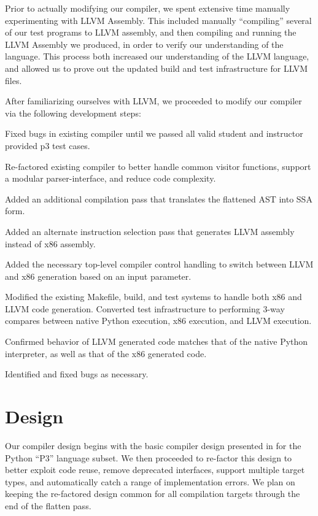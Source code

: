 \documentclass[11pt,twocolumn]{article}
\newenvironment{packed_enum}{
\begin{enumerate}
  \setlength{\itemsep}{1pt}
  \setlength{\parskip}{0pt}
  \setlength{\parsep}{0pt}
}{\end{enumerate}}
\begin{document}
Prior to actually modifying our compiler, we spent extensive time
manually experimenting with LLVM Assembly. This included manually
``compiling'' several of our test programs to LLVM assembly, and then
compiling and running the LLVM Assembly we produced, in order to
verify our understanding of the language. This process both increased
our understanding of the LLVM language, and allowed us to prove out the
updated build and test infrastructure for LLVM files.

After familiarizing ourselves with LLVM, we proceeded to modify our
compiler via the following development steps:

\begin{packed_enum}
\item Fixed bugs in existing compiler until we passed all valid student
  and instructor provided p3 test cases.
\item Re-factored existing compiler to better handle common visitor
  functions, support a modular parser-interface, and reduce code
  complexity.
\item Added an additional compilation pass that translates the flattened
  AST into SSA form.
\item Added an alternate instruction selection pass that generates LLVM
  assembly instead of x86 assembly.
\item Added the necessary top-level compiler control handling to switch
  between LLVM and x86 generation based on an input parameter.
\item Modified the existing Makefile, build, and test systems to handle
  both x86 and LLVM code generation. Converted test infrastructure to
  performing 3-way compares between native Python execution, x86
  execution, and LLVM execution.
\item Confirmed behavior of LLVM generated code matches that of the
  native Python interpreter, as well as that of the x86 generated
  code.
\item Identified and fixed bugs as necessary.
\end{packed_enum}

\section{Design}

Our compiler design begins with the basic compiler design presented in
\cite{siek-chang} for the Python ``P3'' language subset.  We then
proceeded to re-factor this design to better exploit code reuse,
remove deprecated interfaces, support multiple target types, and
automatically catch a range of implementation errors. We plan on
keeping the re-factored design common for all compilation targets
through the end of the flatten pass.
\end{document}
